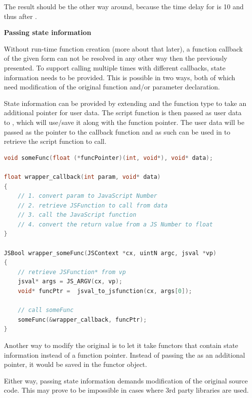 The result should be the other way around, because the time delay for  is 10 and thus after .

\textbf{Passing state information}

Without run-time function creation (more about that later), a function callback of the given form can not be resolved in any other way then the previously presented. To support calling  multiple times with different callbacks, state information needs to be provided. This is possible in two ways, both of which need modification of the original function and/or parameter declaration.

State information can be provided by extending  and the function type to take an additional  pointer for user data. The script function is then passed as user data to , which will use/save it along with the function pointer. The user data will be passed as the  pointer to the  callback function and as such can be used in  to retrieve the script function to call.

\SingleSpacing
\begin{lstlisting}[language=C++, caption=Wrapper code for handling methods that take function pointers \#2]
void someFunc(float (*funcPointer)(int, void*), void* data);

float wrapper_callback(int param, void* data)
{
	// 1. convert param to JavaScript Number
	// 2. retrieve JSFunction to call from data
	// 3. call the JavaScript function
	// 4. convert the return value from a JS Number to float
}

JSBool wrapper_someFunc(JSContext *cx, uintN argc, jsval *vp)
{
	// retrieve JSFunction* from vp
	jsval* args = JS_ARGV(cx, vp);
	void* funcPtr =  jsval_to_jsfunction(cx, args[0]);
	
	// call someFunc
	someFunc(&wrapper_callback, funcPtr);
}
\end{lstlisting}
\OnehalfSpacing

Another way to modify the original  is to let it take functors that contain state information instead of a function pointer. Instead of passing the  as an additional  pointer, it would be saved in the functor object.

Either way, passing state information demands modification of the original source code. This may prove to be impossible in cases where 3rd party libraries are used.

